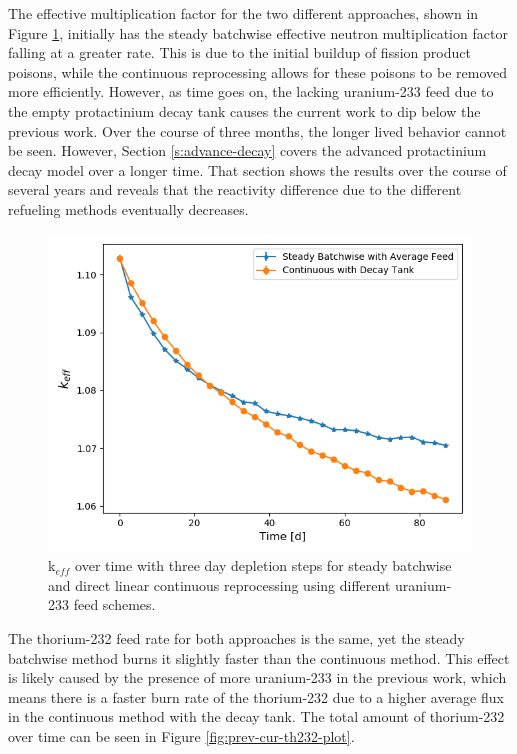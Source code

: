 The effective multiplication factor for the two different approaches, shown in Figure \ref{fig:prev-cur-keff-plot}, initially has the steady batchwise effective neutron multiplication factor falling at a greater rate.
This is due to the initial buildup of fission product poisons, while the continuous reprocessing allows for these poisons to be removed more efficiently.
However, as time goes on, the lacking uranium-233 feed due to the empty protactinium decay tank causes the current work to dip below the previous work.
Over the course of three months, the longer lived behavior cannot be seen.
However, Section \ref{s:advance-decay} covers the advanced protactinium decay model over a longer time.
That section shows the results over the course of several years and reveals that the reactivity difference due to the different refueling methods eventually decreases.

\begin{figure}[H]
  \centering
  \includegraphics[scale=0.7]{images/prev-cur-keff.png}
  \caption{k$_{eff}$ over time with three day depletion steps for steady batchwise and direct linear continuous reprocessing using different uranium-233 feed schemes.}
   \label{fig:prev-cur-keff-plot}
\end{figure}

The thorium-232 feed rate for both approaches is the same, yet the steady batchwise method burns it slightly faster than the continuous method. This effect is likely caused by the presence of more uranium-233 in the previous work, which means there is a faster burn rate of the thorium-232 due to a higher average flux in the continuous method with the decay tank. The total amount of thorium-232 over time can be seen in Figure \ref{fig:prev-cur-th232-plot}.

